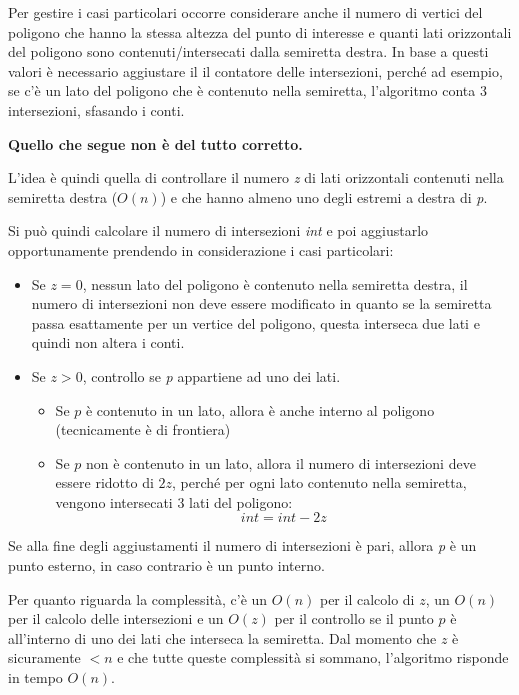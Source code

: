 Per gestire i casi particolari occorre considerare anche il numero di vertici del poligono che hanno la stessa altezza del punto di interesse e quanti lati orizzontali del poligono sono contenuti/intersecati dalla semiretta destra.
In base a questi valori è necessario aggiustare il il contatore delle intersezioni, perché ad esempio, se c'è un lato del poligono che è contenuto nella semiretta, l'algoritmo conta 3 intersezioni, sfasando i conti.

\textbf{Quello che segue non è del tutto corretto.}

L'idea è quindi quella di controllare il numero \textit{z} di lati orizzontali contenuti nella semiretta destra  ($O(n)$) e che hanno almeno uno degli estremi a destra di \textit{p}.

Si può quindi calcolare il numero di intersezioni \textit{int} e poi aggiustarlo opportunamente prendendo in considerazione i casi particolari:

\begin{itemize}
	\item Se $z=0$, nessun lato del poligono è contenuto nella semiretta destra, il numero di intersezioni non deve essere modificato in quanto se la semiretta passa esattamente per un vertice del poligono, questa interseca due lati e quindi non altera i conti.
	\item Se $z > 0$, controllo se \textit{p} appartiene ad uno dei lati.
		\begin{itemize}
			\item Se $p$ è contenuto in un lato, allora è anche interno al poligono (tecnicamente è di frontiera)
			\item Se $p$ non è contenuto in un lato, allora il numero di intersezioni deve essere ridotto di $2z$, perché per ogni lato contenuto nella semiretta, vengono intersecati 3 lati del poligono:
			$$
			int = int - 2z
			$$
		\end{itemize}
\end{itemize}

Se alla fine degli aggiustamenti il numero di intersezioni è pari, allora \textit{p} è un punto esterno, in caso contrario è un punto interno.

Per quanto riguarda la complessità, c'è un $O(n)$ per il calcolo di $z$, un $O(n)$ per il calcolo delle intersezioni e un $O(z)$ per il controllo se il punto $p$ è all'interno di uno dei lati che interseca la semiretta. Dal momento che $z$ è sicuramente $<n$ e che tutte queste complessità si sommano, l'algoritmo risponde in tempo $O(n)$. 
 
